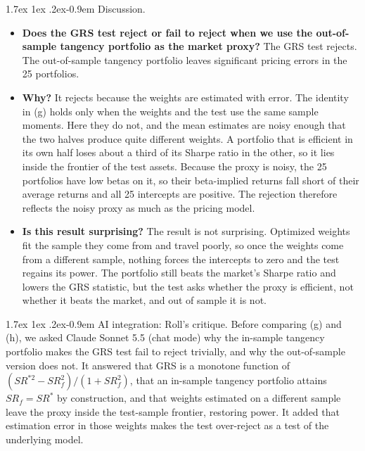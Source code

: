 \documentclass[11pt]{article}
\makeatletter
\renewcommand\paragraph{\@startsection{paragraph}{4}{0pt}%
  {1.7ex \@plus 1ex \@minus .2ex}{-0.9em}%
  {\normalfont\bfseries\normalsize\color{psink}}}
\makeatother
\begin{document}
\paragraph{Discussion.}
\begin{itemize}
\setlength{\itemsep}{4pt}\setlength{\parskip}{0pt}

\item \textbf{Does the GRS test reject or fail to reject when we use the
out-of-sample tangency portfolio as the market proxy?} The GRS test rejects.
The out-of-sample tangency portfolio
leaves significant pricing errors in the 25 portfolios.

\item \textbf{Why?} It rejects because the weights are estimated with
error.
The identity in (g) holds only when the weights and the test use the same
sample moments. Here they do not, and the mean estimates are noisy enough
that the two halves produce quite different weights. A portfolio that is
efficient in its own half loses about a third of its Sharpe ratio in the
other, so it lies inside the frontier of the test assets. Because the proxy is noisy, the 25 portfolios have low betas on it, so their beta-implied returns fall short of their average returns and all 25 intercepts are positive. The rejection therefore reflects the noisy proxy as much as the pricing model.

\item \textbf{Is this result surprising?} The result is not surprising.
Optimized weights fit the sample they come from and travel poorly, so once the weights come from a different sample, nothing forces the intercepts to zero and the test regains its power. The portfolio still beats the market's Sharpe ratio and
lowers the GRS statistic, but the test asks whether the proxy is efficient,
not whether it beats the market, and out of sample it is not.

\end{itemize}

\paragraph{AI integration: Roll's critique.} Before comparing (g) and (h),
we asked Claude Sonnet 5.5 (chat mode) why the in-sample tangency portfolio
makes the GRS test fail to reject trivially, and why the out-of-sample
version does not. It answered that GRS is a monotone function of
$(SR^{*2} - SR_f^2)/(1 + SR_f^2)$, that an in-sample tangency portfolio
attains $SR_f = SR^*$ by construction, and that weights estimated on a
different sample leave the proxy inside the test-sample frontier, restoring
power. It added that estimation error in those weights makes the test
over-reject as a test of the underlying model.
\end{document}
